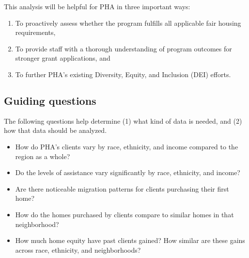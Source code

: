 \documentclass[
  letterpaper,
  DIV=11,
  numbers=noendperiod]{scrartcl}
\providecommand{\tightlist}{%
  \setlength{\itemsep}{0pt}\setlength{\parskip}{0pt}}\usepackage{longtable,booktabs,array}
\begin{document}
\begin{tcolorbox}[enhanced jigsaw, coltitle=black, titlerule=0mm, breakable, colbacktitle=quarto-callout-note-color!10!white, opacityback=0, leftrule=.75mm, opacitybacktitle=0.6, rightrule=.15mm, title=\textcolor{quarto-callout-note-color}{\faInfo}\hspace{0.5em}{Why this matters}, arc=.35mm, colback=white, bottomtitle=1mm, toptitle=1mm, colframe=quarto-callout-note-color-frame, bottomrule=.15mm, toprule=.15mm, left=2mm]

This analysis will be helpful for PHA in three important ways:

\begin{enumerate}
\def\labelenumi{\arabic{enumi}.}
\tightlist
\item
  To proactively assess whether the program fulfills all applicable fair
  housing requirements,
\item
  To provide staff with a thorough understanding of program outcomes for
  stronger grant applications, and
\item
  To further PHA's existing Diversity, Equity, and Inclusion (DEI)
  efforts.
\end{enumerate}

\end{tcolorbox}

\hypertarget{guiding-questions}{%
\subsection{Guiding questions}\label{guiding-questions}}

The following questions help determine (1) what kind of data is needed,
and (2) how that data should be analyzed.

\begin{itemize}
\tightlist
\item
  How do PHA's clients vary by race, ethnicity, and income compared to
  the region as a whole?
\item
  Do the levels of assistance vary significantly by race, ethnicity, and
  income?
\item
  Are there noticeable migration patterns for clients purchasing their
  first home?
\item
  How do the homes purchased by clients compare to similar homes in that
  neighborhood?
\item
  How much home equity have past clients gained? How similar are these
  gains across race, ethnicity, and neighborhoods?
\end{itemize}
\end{document}

